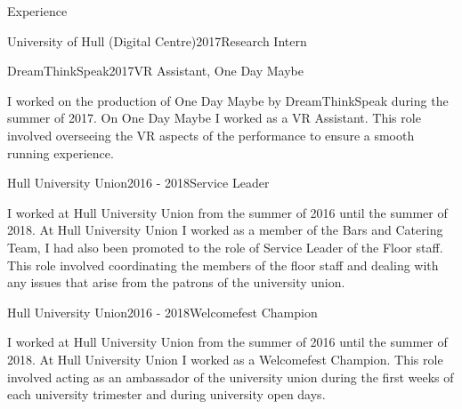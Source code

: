 \documentclass{cv} %
\begin{document}
\begin{rSection}{Experience}
\begin{rSubsection}{University of Hull (Digital Centre)}{2017}{Research Intern}{}
\end{rSubsection}


\begin{rSubsection}{DreamThinkSpeak}{2017}{VR Assistant, One Day Maybe}{}

\item I worked on the production of One Day Maybe by DreamThinkSpeak during the summer of 2017. On One Day Maybe I worked as a VR Assistant. This role involved overseeing the VR aspects of the performance to ensure a smooth running experience.

\end{rSubsection}


\begin{rSubsection}{Hull University Union}{2016 - 2018}{Service Leader}{}

\item I worked at Hull University Union from the summer of 2016 until the summer of 2018. At Hull University Union I worked as a member of the Bars and Catering Team, I had also been promoted to the role of Service Leader of the Floor staff. This role involved coordinating the members of the floor staff and dealing with any issues that arise from the patrons of the university union.

\end{rSubsection}


\begin{rSubsection}{Hull University Union}{2016 - 2018}{Welcomefest Champion}{}

\item I worked at Hull University Union from the summer of 2016 until the summer of 2018. At Hull University Union I worked as a Welcomefest Champion. This role involved acting as an ambassador of the university union during the first weeks of each university trimester and during university open days.

\end{rSubsection}

\end{rSection}

\end{document}
